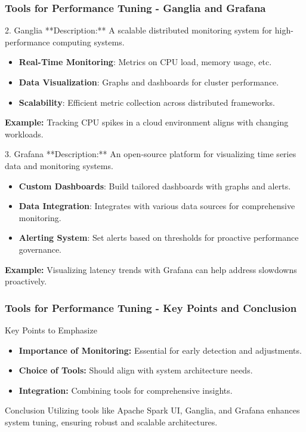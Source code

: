 \documentclass{beamer}
\begin{document}
\begin{frame}[fragile]
    \frametitle{Tools for Performance Tuning - Ganglia and Grafana}
    \begin{block}{2. Ganglia}
        **Description:** A scalable distributed monitoring system for high-performance computing systems.

        \begin{itemize}
            \item \textbf{Real-Time Monitoring}: Metrics on CPU load, memory usage, etc.
            \item \textbf{Data Visualization}: Graphs and dashboards for cluster performance.
            \item \textbf{Scalability}: Efficient metric collection across distributed frameworks.
        \end{itemize}
        
        \textbf{Example:} Tracking CPU spikes in a cloud environment aligns with changing workloads.
    \end{block}

    \begin{block}{3. Grafana}
        **Description:** An open-source platform for visualizing time series data and monitoring systems.

        \begin{itemize}
            \item \textbf{Custom Dashboards}: Build tailored dashboards with graphs and alerts.
            \item \textbf{Data Integration}: Integrates with various data sources for comprehensive monitoring.
            \item \textbf{Alerting System}: Set alerts based on thresholds for proactive performance governance.
        \end{itemize}

        \textbf{Example:} Visualizing latency trends with Grafana can help address slowdowns proactively.
    \end{block}
\end{frame}

\begin{frame}[fragile]
    \frametitle{Tools for Performance Tuning - Key Points and Conclusion}
    \begin{block}{Key Points to Emphasize}
        \begin{itemize}
            \item \textbf{Importance of Monitoring:} Essential for early detection and adjustments.
            \item \textbf{Choice of Tools:} Should align with system architecture needs.
            \item \textbf{Integration:} Combining tools for comprehensive insights.
        \end{itemize}
    \end{block}

    \begin{block}{Conclusion}
        Utilizing tools like Apache Spark UI, Ganglia, and Grafana enhances system tuning, ensuring robust and scalable architectures.
    \end{block}
\end{frame}
\end{document}
